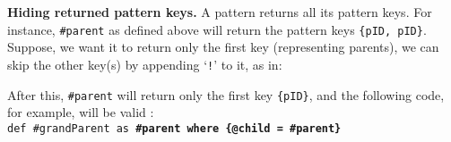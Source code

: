 \textbf{Hiding returned pattern keys.} A pattern returns all its pattern keys. For instance, \texttt{\#parent} as defined above will return the pattern keys \texttt{\{pID, pID\}}. %
Suppose, we want it to return only the first key (representing parents), we can skip the other key(s) by appending `\texttt{!}' to it, as in:\\

After this, \texttt{\#parent} will return only the first key \texttt{\{pID\}}, and  the following code, for example, will be valid \dsl:\\ %
 \colorbox{Light}{\small \texttt{def \#grandParent as \bfseries{\#parent where \{@child = \#parent\}}}}

